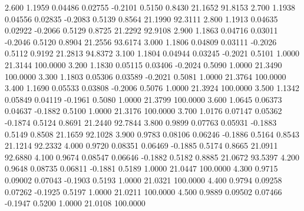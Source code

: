    2.600   1.1959   0.04486   0.02755  -0.2101   0.5150   0.8430  21.1652  91.8153
   2.700   1.1938   0.04556   0.02835  -0.2083   0.5139   0.8564  21.1990  92.3111
   2.800   1.1913   0.04635   0.02922  -0.2066   0.5129   0.8725  21.2292  92.9108
   2.900   1.1863   0.04716   0.03011  -0.2046   0.5120   0.8904  21.2556  93.6174
   3.000   1.1806   0.04809   0.03111  -0.2026   0.5112   0.9192  21.2813  94.8372
   3.100   1.1804   0.04944   0.03245  -0.2021   0.5101   1.0000  21.3144 100.0000
   3.200   1.1830   0.05115   0.03406  -0.2024   0.5090   1.0000  21.3490 100.0000
   3.300   1.1803   0.05306   0.03589  -0.2021   0.5081   1.0000  21.3764 100.0000
   3.400   1.1690   0.05533   0.03808  -0.2006   0.5076   1.0000  21.3924 100.0000
   3.500   1.1342   0.05849   0.04119  -0.1961   0.5080   1.0000  21.3799 100.0000
   3.600   1.0645   0.06373   0.04637  -0.1882   0.5100   1.0000  21.3176 100.0000
   3.700   1.0176   0.07147   0.05362  -0.1874   0.5124   0.8691  21.2440  92.7844
   3.800   0.9899   0.07763   0.05931  -0.1883   0.5149   0.8508  21.1659  92.1028
   3.900   0.9783   0.08106   0.06246  -0.1886   0.5164   0.8543  21.1214  92.2332
   4.000   0.9720   0.08351   0.06469  -0.1885   0.5174   0.8665  21.0911  92.6880
   4.100   0.9674   0.08547   0.06646  -0.1882   0.5182   0.8885  21.0672  93.5397
   4.200   0.9648   0.08735   0.06811  -0.1881   0.5189   1.0000  21.0447 100.0000
   4.300   0.9715   0.09002   0.07043  -0.1903   0.5193   1.0000  21.0321 100.0000
   4.400   0.9794   0.09258   0.07262  -0.1925   0.5197   1.0000  21.0211 100.0000
   4.500   0.9889   0.09502   0.07466  -0.1947   0.5200   1.0000  21.0108 100.0000
